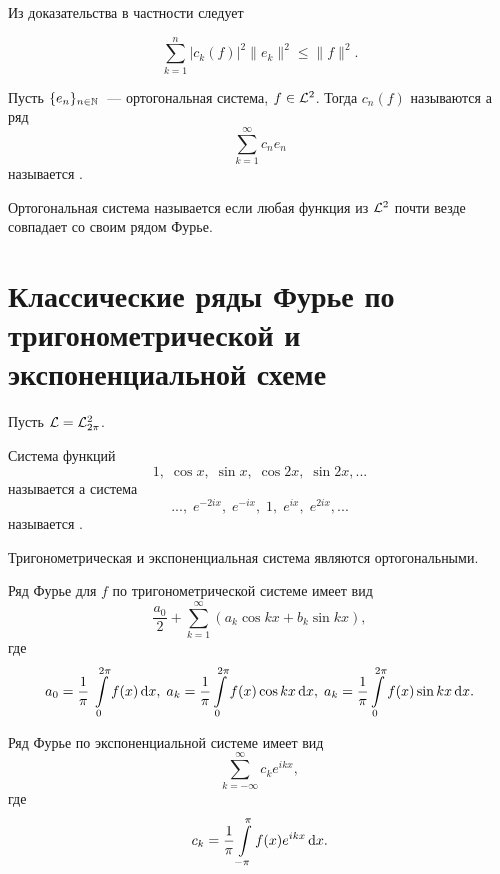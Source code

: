 \documentclass{notes}
\begin{document}
	Из доказательства в частности следует
	\begin{st}
		\[
			\sum\limits_{k = 1}^n |c_k(f)|^2 \|e_k\|^2 \leqslant \|f\|^2.
		\]
	\end{st}

	\begin{de}
		Пусть $\{e_n\}_{n \in \mathbb{N}}$~--- ортогональная система, $f \in \mathcal{L}^2$. Тогда $c_n(f)$ называются  а ряд
		\[
			\sum\limits_{k = 1}^{\infty} c_n e_n
		\]
		называется .
	\end{de}

	\begin{de}
		Ортогональная система называется  если любая функция из $\mathcal{L}^2$ почти везде совпадает со своим рядом Фурье.
	\end{de}

\section{Классические ряды Фурье по тригонометрической и экспоненциальной схеме}

	Пусть $\mathcal{L} = \mathcal{L}_{2 \pi}^2$.

	\begin{de}
		Система функций
		\[
			1, \; \cos x, \; \sin x, \; \cos 2 x, \; \sin 2 x,...
		\]
		называется  а система
		\[
			..., \; e^{-2ix}, \; e^{-ix}, \; 1, \; e^{ix}, \; e^{2ix},...
		\]
		называется \ti{экспоненциальной}.
	\end{de}

	\begin{st}
		Тригонометрическая и экспоненциальная система являются ортогональными.
	\end{st}

	\begin{st}
		Ряд Фурье для $f$ по тригонометрической системе имеет вид
		\[
			\dfrac{a_0}{2} + \sum\limits_{k = 1}^{\infty} (a_k \cos k x + b_k \sin k x),
		\]
		где
		\[
			a_0 = \dfrac{1}{\pi} \dfrac{}{} \int\limits_{0}^{2\pi} f(x) \, \mathrm{d} x, \; a_k = \dfrac{1}{\pi} \int\limits_{0}^{2\pi} f(x) \cos k x \, \mathrm{d} x, \; a_k = \dfrac{1}{\pi} \int\limits_{0}^{2\pi} f(x) \sin k x \, \mathrm{d} x.
		\]
	\end{st}

	\begin{st}
		Ряд Фурье по экспоненциальной системе имеет вид
		\[
			\sum\limits_{k = -\infty}^{\infty} c_k e^{ikx},
		\]
		где
		\[
			c_k = \dfrac{1}{\pi} \int\limits_{-\pi}^{\pi} f(x) e^{ikx} \, \mathrm{d} x.
		\]
	\end{st}
\end{document}

